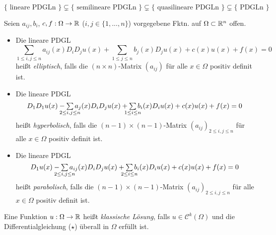 \documentclass{cheat-sheet}
\begin{document}
\begin{bem}
  $\{\text{ lineare PDGLn }\} \subsetneq \{\text{ semilineare PDGLn }\} \subsetneq \{\text{ quasilineare PDGLn }\} \subsetneq \{\text{ PDGLn }\}$
\end{bem}


\begin{defn}
  Seien $a_{ij}, b_i$, $c, f : \Omega \to \mathbb{R}$ ($i, j \in \{ 1, ..., n \}$) vorgegebene Fktn. auf $\Omega \subset \mathbb{R}^n$ offen.
  \begin{itemize}
    \item Die lineare PDGL
    \[ \sum_{1 \leq i, j \leq n} a_{ij}(x) D_i D_j u(x) + \sum_{1 \leq j \leq n} b_j(x) D_j u(x) + c(x) u(x) + f(x) = 0 \]
    heißt \emph{elliptisch}, falls die $(n \times n)$-Matrix $(a_{ij})$ für alle $x \in \Omega$ positiv definit ist.
    \item Die lineare PDGL
    \[ D_1 D_1 u(x) - \sum_{\mathclap{2 \leq i, j \leq n}} a_{j}(x) D_i D_j u(x) + \sum_{\mathclap{1 \leq i \leq n}} b_i(x) D_i u(x) + c(x) u(x) + f(x) = 0 \]
    heißt \emph{hyperbolisch}, falls die $(n{-}1) \times (n{-}1)$-Matrix $(a_{ij})_{2 \leq i, j \leq n}$ für alle $x \in \Omega$ positiv definit ist.
    \item Die lineare PDGL
    \[ D_1 u(x) - \sum_{\mathclap{2 \leq i, j \leq n}} a_{ij}(x) D_i D_j u(x) + \sum_{\mathclap{2 \leq i \leq n}} b_i(x) D_i u(x) + c(x) u(x) + f(x) = 0 \]
    heißt \emph{parabolisch}, falls die $(n{-}1) \times (n{-}1)$-Matrix $(a_{ij})_{2 \leq i,j \leq n}$ für alle $x \in \Omega$ positiv definit ist.
  \end{itemize}
\end{defn}



\begin{defn}
  Eine Funktion $u : \Omega \to \mathbb{R}$ heißt \emph{klassische Lösung}, falls $u \in \mathcal{C}^k(\Omega)$ und die Differentialgleichung ($\star$) überall in $\Omega$ erfüllt ist.
\end{defn}



\end{document}
